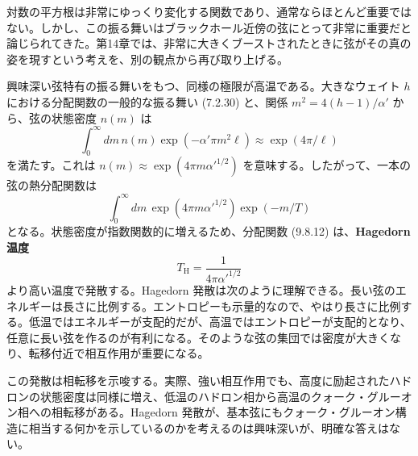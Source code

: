 対数の平方根は非常にゆっくり変化する関数であり、通常ならほとんど重要ではない。しかし、この振る舞いはブラックホール近傍の弦にとって非常に重要だと論じられてきた。第14章では、非常に大きくブーストされたときに弦がその真の姿を現すという考えを、別の観点から再び取り上げる。


興味深い弦特有の振る舞いをもつ、同様の極限が高温である。大きなウェイト $h$ における分配関数の一般的な振る舞い (7.2.30) と、関係 $m^2=4(h-1)/\alpha'$ から、弦の状態密度 $n(m)$ は
\begin{equation}
\int_0^\infty dm\,n(m)\exp(-\alpha'\pi m^2\ell)
\approx\exp(4\pi/\ell)
\tag{9.8.11}\label{eq:9.8.11}
\end{equation}
を満たす。これは $n(m)\approx\exp(4\pi m\alpha'^{1/2})$ を意味する。したがって、一本の弦の熱分配関数は
\begin{equation}
\int_0^\infty dm\,\exp(4\pi m\alpha'^{1/2})\exp(-m/T)
\tag{9.8.12}\label{eq:9.8.12}
\end{equation}
となる。状態密度が指数関数的に増えるため、分配関数 (9.8.12) は、\textbf{Hagedorn 温度}
\begin{equation}
T_{\mathrm H}=\frac1{4\pi\alpha'^{1/2}}
\tag{9.8.13}\label{eq:9.8.13}
\end{equation}
より高い温度で発散する。Hagedorn 発散は次のように理解できる。長い弦のエネルギーは長さに比例する。エントロピーも示量的なので、やはり長さに比例する。低温ではエネルギーが支配的だが、高温ではエントロピーが支配的となり、任意に長い弦を作るのが有利になる。そのような弦の集団では密度が大きくなり、転移付近で相互作用が重要になる。

この発散は相転移を示唆する。実際、強い相互作用でも、高度に励起されたハドロンの状態密度は同様に増え、低温のハドロン相から高温のクォーク・グルーオン相への相転移がある。Hagedorn 発散が、基本弦にもクォーク・グルーオン構造に相当する何かを示しているのかを考えるのは興味深いが、明確な答えはない。


